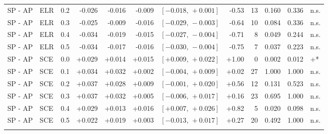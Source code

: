 \begin{landscape}
\begin{scriptsize}
\begin{longtable}{lllrrrrrrrrl}
SP - AP & ELR & 0.2 & -0.026 & -0.016 & -0.009 & $[-0.018,\,+0.001]$ & -0.53 & 13 & 0.160 & 0.336 & n.s. \\
SP - AP & ELR & 0.3 & -0.025 & -0.009 & -0.016 & $[-0.029,\,-0.003]$ & -0.64 & 10 & 0.084 & 0.336 & n.s. \\
SP - AP & ELR & 0.4 & -0.034 & -0.019 & -0.015 & $[-0.027,\,-0.004]$ & -0.71 & 8 & 0.049 & 0.244 & n.s. \\
SP - AP & ELR & 0.5 & -0.034 & -0.017 & -0.016 & $[-0.030,\,-0.004]$ & -0.75 & 7 & 0.037 & 0.223 & n.s. \\
SP - AP & SCE & 0.0 & +0.029 & +0.014 & +0.015 & $[+0.009,\,+0.022]$ & +1.00 & 0 & 0.002 & 0.012 & +* \\
SP - AP & SCE & 0.1 & +0.034 & +0.032 & +0.002 & $[-0.004,\,+0.009]$ & +0.02 & 27 & 1.000 & 1.000 & n.s. \\
SP - AP & SCE & 0.2 & +0.037 & +0.028 & +0.009 & $[-0.001,\,+0.020]$ & +0.56 & 12 & 0.131 & 0.523 & n.s. \\
SP - AP & SCE & 0.3 & +0.037 & +0.032 & +0.005 & $[-0.006,\,+0.017]$ & +0.16 & 23 & 0.695 & 1.000 & n.s. \\
SP - AP & SCE & 0.4 & +0.029 & +0.013 & +0.016 & $[+0.007,\,+0.026]$ & +0.82 & 5 & 0.020 & 0.098 & n.s. \\
SP - AP & SCE & 0.5 & +0.022 & +0.019 & +0.003 & $[-0.013,\,+0.017]$ & +0.27 & 20 & 0.492 & 1.000 & n.s. \\
\addlinespace
\bottomrule
\end{longtable}
\end{scriptsize}
\end{landscape}
